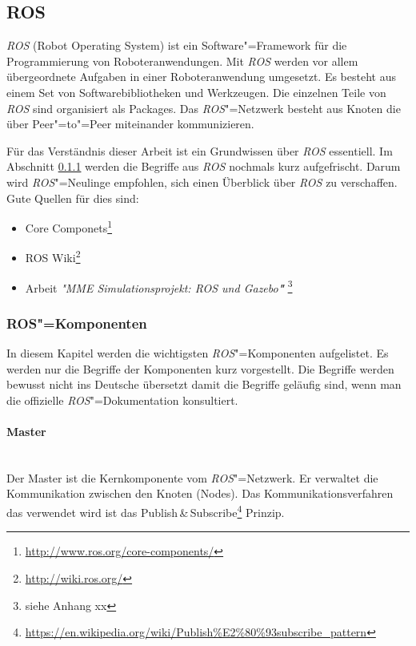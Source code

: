 \subsection{ROS}
\textit{ROS} (Robot Operating System) ist ein Software"=Framework für die Programmierung von Roboteranwendungen.
Mit \textit{ROS} werden vor allem übergeordnete Aufgaben in einer Roboteranwendung umgesetzt.
Es besteht aus einem Set von Softwarebibliotheken und Werkzeugen.
Die einzelnen Teile von \textit{ROS} sind organisiert als Packages.
Das \textit{ROS}"=Netzwerk besteht aus Knoten die über Peer"=to"=Peer miteinander kommunizieren.

Für das Verständnis dieser Arbeit ist ein Grundwissen über \textit{ROS} essentiell.
Im Abschnitt \ref{chap:ros-komponenten} werden die Begriffe aus \textit{ROS} nochmals kurz aufgefrischt.
Darum wird \textit{ROS}"=Neulinge empfohlen, sich einen Überblick über \textit{ROS} zu verschaffen.
Gute Quellen für dies sind:
\begin{itemize}
\item Core Componets\footnote{\url{http://www.ros.org/core-components/}} 
\item ROS Wiki\footnote{\url{http://wiki.ros.org/}}
\item Arbeit \textit{\textsc{"}MME Simulationsprojekt: ROS und Gazebo\textbf{"}} \footnote{siehe Anhang xx} %
\end{itemize}

\subsubsection{ROS"=Komponenten}
\label{chap:ros-komponenten}
In diesem Kapitel werden die wichtigsten \textit{ROS}"=Komponenten aufgelistet.
Es werden nur die Begriffe der Komponenten kurz vorgestellt.
Die Begriffe werden bewusst nicht ins Deutsche übersetzt damit die Begriffe geläufig sind, wenn man die offizielle \textit{ROS}"=Dokumentation konsultiert.

\paragraph*{Master} \mbox{}\\
Der Master ist die Kernkomponente vom \textit{ROS}"=Netzwerk.
Er verwaltet die Kommunikation zwischen den Knoten (Nodes).
Das Kommunikationsverfahren das verwendet wird ist das Publish\,\&\,Subscribe\footnote{\url{https://en.wikipedia.org/wiki/Publish\%E2\%80\%93subscribe_pattern}}  Prinzip. 

